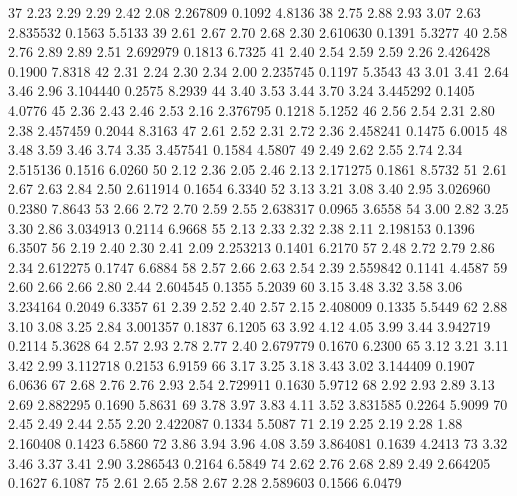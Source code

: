 \documentclass[12pt]{article}
\begin{document}
\begin{Schunk}
\begin{Soutput}
37     2.23    2.29    2.29    2.42    2.08 2.267809  0.1092 4.8136
38     2.75    2.88    2.93    3.07    2.63 2.835532  0.1563 5.5133
39     2.61    2.67    2.70    2.68    2.30 2.610630  0.1391 5.3277
40     2.58    2.76    2.89    2.89    2.51 2.692979  0.1813 6.7325
41     2.40    2.54    2.59    2.59    2.26 2.426428  0.1900 7.8318
42     2.31    2.24    2.30    2.34    2.00 2.235745  0.1197 5.3543
43     3.01    3.41    2.64    3.46    2.96 3.104440  0.2575 8.2939
44     3.40    3.53    3.44    3.70    3.24 3.445292  0.1405 4.0776
45     2.36    2.43    2.46    2.53    2.16 2.376795  0.1218 5.1252
46     2.56    2.54    2.31    2.80    2.38 2.457459  0.2044 8.3163
47     2.61    2.52    2.31    2.72    2.36 2.458241  0.1475 6.0015
48     3.48    3.59    3.46    3.74    3.35 3.457541  0.1584 4.5807
49     2.49    2.62    2.55    2.74    2.34 2.515136  0.1516 6.0260
50     2.12    2.36    2.05    2.46    2.13 2.171275  0.1861 8.5732
51     2.61    2.67    2.63    2.84    2.50 2.611914  0.1654 6.3340
52     3.13    3.21    3.08    3.40    2.95 3.026960  0.2380 7.8643
53     2.66    2.72    2.70    2.59    2.55 2.638317  0.0965 3.6558
54     3.00    2.82    3.25    3.30    2.86 3.034913  0.2114 6.9668
55     2.13    2.33    2.32    2.38    2.11 2.198153  0.1396 6.3507
56     2.19    2.40    2.30    2.41    2.09 2.253213  0.1401 6.2170
57     2.48    2.72    2.79    2.86    2.34 2.612275  0.1747 6.6884
58     2.57    2.66    2.63    2.54    2.39 2.559842  0.1141 4.4587
59     2.60    2.66    2.66    2.80    2.44 2.604545  0.1355 5.2039
60     3.15    3.48    3.32    3.58    3.06 3.234164  0.2049 6.3357
61     2.39    2.52    2.40    2.57    2.15 2.408009  0.1335 5.5449
62     2.88    3.10    3.08    3.25    2.84 3.001357  0.1837 6.1205
63     3.92    4.12    4.05    3.99    3.44 3.942719  0.2114 5.3628
64     2.57    2.93    2.78    2.77    2.40 2.679779  0.1670 6.2300
65     3.12    3.21    3.11    3.42    2.99 3.112718  0.2153 6.9159
66     3.17    3.25    3.18    3.43    3.02 3.144409  0.1907 6.0636
67     2.68    2.76    2.76    2.93    2.54 2.729911  0.1630 5.9712
68     2.92    2.93    2.89    3.13    2.69 2.882295  0.1690 5.8631
69     3.78    3.97    3.83    4.11    3.52 3.831585  0.2264 5.9099
70     2.45    2.49    2.44    2.55    2.20 2.422087  0.1334 5.5087
71     2.19    2.25    2.19    2.28    1.88 2.160408  0.1423 6.5860
72     3.86    3.94    3.96    4.08    3.59 3.864081  0.1639 4.2413
73     3.32    3.46    3.37    3.41    2.90 3.286543  0.2164 6.5849
74     2.62    2.76    2.68    2.89    2.49 2.664205  0.1627 6.1087
75     2.61    2.65    2.58    2.67    2.28 2.589603  0.1566 6.0479

\end{Soutput}
\end{Schunk}
\end{document}
